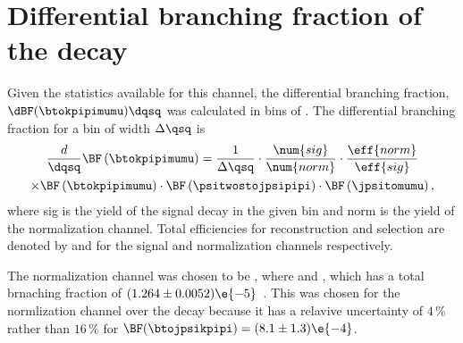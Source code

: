 \section{Differential branching fraction of the decay \btokpipimumu}

Given the statistics available for this channel, the differential branching fraction,
$\dBF(\btokpipimumu)\dqsq$ was calculated in bins of \qsq.
The differential branching fraction for a bin of width $\Delta\qsq$ is
\begin{multline}
  \frac{d}{\dqsq}\BF\left(\btokpipimumu\right)
  =
  \frac{1}{\Delta\qsq} \cdot
  \frac{\num{sig}}{\num{norm}} \cdot
  \frac{\eff{norm}}{\eff{sig}} \\
  \times\BF\left(\btokpipimumu\right) \cdot
  \BF\left(\psitwostojpsipipi\right) \cdot
  \BF\left(\jpsitomumu\right),
\end{multline}
where \num{sig} is the yield of the signal decay \btokpipimumu in the given \qsq bin and \num{norm}
is the yield of the normalization channel.
Total efficiencies for reconstruction and selection are denoted by  and  for the
signal and normalization channels respectively.

The normalization channel was chosen to be \btopsitwosk, where \psitwostojpsipipi and \jpsitomumu,
which has a total brnaching fraction of $(1.264 \pm 0.0052)\e{-5}$~\cite{PDG2012}.
This was chosen for the normlization channel over the decay \btojpsikpipi because it has a relavive
uncertainty of $4\,\%$ rather than $16\,\%$ for $\BF(\btojpsikpipi) = (8.1\pm1.3)\e{-4}$.















